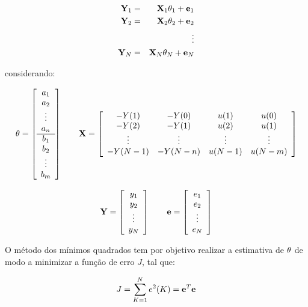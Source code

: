\begin{eqnarray}
\mathbf{Y}_1 & = & \mathbf{X}_1\mathbf{\theta}_1 + \mathbf{e}_1\nonumber\\
\mathbf{Y}_2 & = & \mathbf{X}_2\mathbf{\theta}_2 + \mathbf{e}_2\nonumber\\
& & \vdots\nonumber\\ 
\mathbf{Y}_N & = & \mathbf{X}_N\mathbf{\theta}_N + \mathbf{e}_N\nonumber
\end{eqnarray}

\noindent considerando:

\begin{equation*}
\mathbf{\theta} = \left[
\begin{array}{c}
a_1\\
a_2\\
\vdots\\
a_n\\
\hline
b_1\\
b_2\\
\vdots\\
b_m
\end{array}
\right] \qquad
\mathbf{X} = \left[
\begin{array}{cccc}
-Y(1) & -Y(0) & u(1) & u(0)\\
-Y(2) & -Y(1) & u(2) & u(1)\\
\vdots & \vdots & \vdots & \vdots\\
-Y(N-1) & -Y(N-n) & u(N-1) & u(N-m)
\end{array}
\right]
\end{equation*}

\begin{equation*}
\mathbf{Y} = \left[
\begin{array}{c}
y_1\\
y_2\\
\vdots\\
y_N
\end{array}
\right] \qquad
\mathbf{e} = \left[
\begin{array}{c}
e_1\\
e_2\\
\vdots\\
e_N
\end{array}
\right]
\end{equation*}

O método dos mínimos quadrados tem por objetivo realizar a estimativa de
$\mathbf{\theta}$ de modo a minimizar a função de erro $J$, tal que:

\begin{equation}
J = \sum_{K = 1}^N e^2(K) = \mathbf{e}^T\mathbf{e}
\end{equation}

